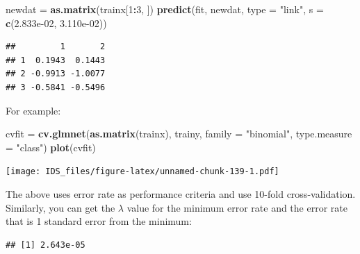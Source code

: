 \documentclass[12pt,]{krantz}
\makeatletter
\newenvironment{Shaded}{\begin{snugshade}}{\end{snugshade}}
\newcommand{\DataTypeTok}[1]{\textcolor[rgb]{0.27,0.27,0.27}{#1}}
\newcommand{\DecValTok}[1]{\textcolor[rgb]{0.06,0.06,0.06}{#1}}
\newcommand{\FloatTok}[1]{\textcolor[rgb]{0.06,0.06,0.06}{#1}}
\newcommand{\KeywordTok}[1]{\textcolor[rgb]{0.27,0.27,0.27}{\textbf{#1}}}
\newcommand{\NormalTok}[1]{#1}
\newcommand{\OperatorTok}[1]{\textcolor[rgb]{0.43,0.43,0.43}{\textbf{#1}}}
\newcommand{\StringTok}[1]{\textcolor[rgb]{0.5,0.5,0.5}{#1}}
\newenvironment{kframe}{%
\medskip{}
\setlength{\fboxsep}{.8em}
 \def\at@end@of@kframe{}%
 \ifinner\ifhmode%
  \def\at@end@of@kframe{\end{minipage}}%
  \begin{minipage}{\columnwidth}%
 \fi\fi%
 \def\FrameCommand##1{\hskip\@totalleftmargin \hskip-\fboxsep
 \colorbox{shadecolor}{##1}\hskip-\fboxsep
     \hskip-\linewidth \hskip-\@totalleftmargin \hskip\columnwidth}%
 \MakeFramed {\advance\hsize-\width
   \@totalleftmargin\z@ \linewidth\hsize
   \@setminipage}}%
 {\par\unskip\endMakeFramed%
 \at@end@of@kframe}
\renewenvironment{Shaded}{\begin{kframe}}{\end{kframe}}
\makeatother
\begin{document}
\begin{Shaded}
\begin{Highlighting}[]
\NormalTok{newdat =}\StringTok{ }\KeywordTok{as.matrix}\NormalTok{(trainx[}\DecValTok{1}\OperatorTok{:}\DecValTok{3}\NormalTok{, ])}
\KeywordTok{predict}\NormalTok{(fit, newdat, }\DataTypeTok{type =} \StringTok{"link"}\NormalTok{, }\DataTypeTok{s =} \KeywordTok{c}\NormalTok{(}\FloatTok{2.833e-02}\NormalTok{, }\FloatTok{3.110e-02}\NormalTok{))}
\end{Highlighting}
\end{Shaded}

\begin{verbatim}
##         1       2
## 1  0.1943  0.1443
## 2 -0.9913 -1.0077
## 3 -0.5841 -0.5496
\end{verbatim}

For example:

\begin{Shaded}
\begin{Highlighting}[]
\NormalTok{cvfit =}\StringTok{ }\KeywordTok{cv.glmnet}\NormalTok{(}\KeywordTok{as.matrix}\NormalTok{(trainx), trainy, }
                  \DataTypeTok{family =} \StringTok{"binomial"}\NormalTok{, }\DataTypeTok{type.measure =} \StringTok{"class"}\NormalTok{)}
\KeywordTok{plot}\NormalTok{(cvfit)}
\end{Highlighting}
\end{Shaded}

\texttt{[image: IDS\_files/figure-latex/unnamed-chunk-139-1.pdf]}

The above uses error rate as performance criteria and use 10-fold cross-validation. Similarly, you can get the \(\lambda\) value for the minimum error rate and the error rate that is 1 standard error from the minimum:

\begin{Shaded}
\end{Shaded}

\begin{verbatim}
## [1] 2.643e-05
\end{verbatim}

\begin{Shaded}
\end{Shaded}
\end{document}
